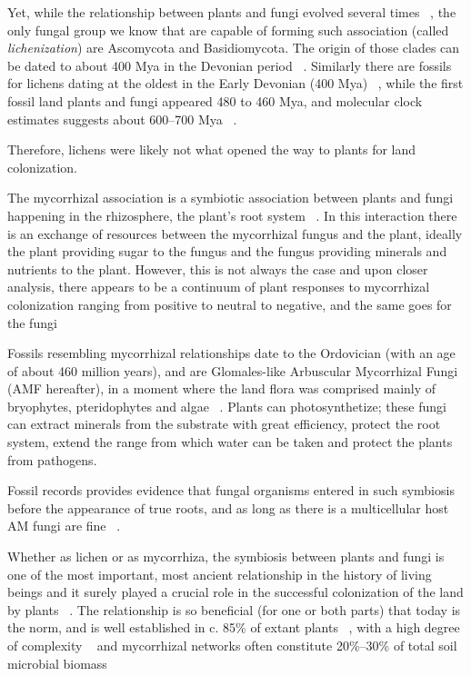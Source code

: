 Yet, while the relationship between plants and fungi evolved several times ~\citep{gargas1995}, the only fungal group we know that are capable of forming such association (called \emph{lichenization}) are Ascomycota and Basidiomycota. The origin of those clades can be dated to about 400 Mya in the Devonian period ~\citep{berbee1993}. Similarly there are fossils for lichens dating at the oldest in the Early Devonian (400 Mya) ~\citep{taylor1997, honegger2013}, while the first fossil land plants and fungi appeared 480 to 460 Mya, and molecular clock estimates suggests about 600--700 Mya ~\citep{berbee1993, heckman2001}.

Therefore, lichens were likely not what opened the way to plants for land colonization.

The mycorrhizal association is a symbiotic association between plants and fungi happening in the rhizosphere, the plant's root system ~\citep{barman2016}. In this interaction there is an exchange of resources between the mycorrhizal fungus and the plant, ideally the plant providing sugar to the fungus and the fungus providing minerals and nutrients to the plant. However, this is not always the case and upon closer analysis, there appears to be a continuum of plant responses to mycorrhizal colonization ranging from positive to neutral to negative, and the same goes for the fungi ~\citep{johnson1997}

Fossils resembling mycorrhizal relationships date to the Ordovician (with an age of about 460 million years), and are Glomales-like Arbuscular Mycorrhizal Fungi (AMF hereafter), in a moment where the land flora was comprised mainly of bryophytes, pteridophytes and algae ~\citep{redecker2000}. Plants can photosynthetize; these fungi can extract minerals from the substrate with great efficiency, protect the root system, extend the range from which water can be taken and protect the plants from pathogens.

Fossil records provides evidence that fungal organisms entered in such symbiosis before the appearance of true roots, and as long as there is a multicellular host AM fungi are fine ~\citep{wang2006, bonfante2008}.

Whether as lichen or as mycorrhiza, the symbiosis between plants and fungi is one of the most important, most ancient relationship in the history of living beings and it surely played a crucial role in the successful colonization of the land by plants ~\citep{pirozynski1975, malloch1980, harley1987, trappe1987, selosse1998, brundrett2002}. The relationship is so beneficial (for one or both parts) that today is the norm, and is well established in c. 85\% of extant plants ~\citep{cairney2000, strullu-derrien2018}, with a high degree of complexity ~\citep{heijden2015} and mycorrhizal networks often constitute 20\%–30\% of total soil microbial biomass ~\citep{leake2011}

